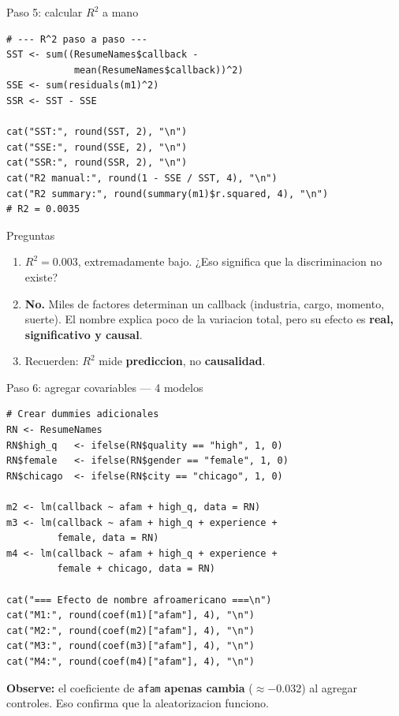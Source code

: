 \documentclass[aspectratio=169, 11pt]{beamer}
\begin{document}
\begin{frame}[fragile]{Paso 5: calcular $R^2$ a mano}
\begin{lstlisting}[basicstyle=\ttfamily\scriptsize]
# --- R^2 paso a paso ---
SST <- sum((ResumeNames$callback -
            mean(ResumeNames$callback))^2)
SSE <- sum(residuals(m1)^2)
SSR <- SST - SSE

cat("SST:", round(SST, 2), "\n")
cat("SSE:", round(SSE, 2), "\n")
cat("SSR:", round(SSR, 2), "\n")
cat("R2 manual:", round(1 - SSE / SST, 4), "\n")
cat("R2 summary:", round(summary(m1)$r.squared, 4), "\n")
# R2 = 0.0035
\end{lstlisting}

\vspace{0.1cm}
\begin{alertblock}{Preguntas}
\footnotesize
\begin{enumerate}\setlength{\itemsep}{1pt}
  \item $R^2 = 0.003$, extremadamente bajo. ¿Eso significa que la discriminacion no existe?
  \item \textbf{No.} Miles de factores determinan un callback (industria, cargo, momento, suerte). El nombre explica poco de la variacion total, pero su efecto es \textbf{real, significativo y causal}.
  \item Recuerden: $R^2$ mide \textbf{prediccion}, no \textbf{causalidad}.
\end{enumerate}
\end{alertblock}
\end{frame}

\begin{frame}[fragile]{Paso 6: agregar covariables --- 4 modelos}
\begin{lstlisting}[basicstyle=\ttfamily\scriptsize]
# Crear dummies adicionales
RN <- ResumeNames
RN$high_q   <- ifelse(RN$quality == "high", 1, 0)
RN$female   <- ifelse(RN$gender == "female", 1, 0)
RN$chicago  <- ifelse(RN$city == "chicago", 1, 0)

m2 <- lm(callback ~ afam + high_q, data = RN)
m3 <- lm(callback ~ afam + high_q + experience +
         female, data = RN)
m4 <- lm(callback ~ afam + high_q + experience +
         female + chicago, data = RN)

cat("=== Efecto de nombre afroamericano ===\n")
cat("M1:", round(coef(m1)["afam"], 4), "\n")
cat("M2:", round(coef(m2)["afam"], 4), "\n")
cat("M3:", round(coef(m3)["afam"], 4), "\n")
cat("M4:", round(coef(m4)["afam"], 4), "\n")
\end{lstlisting}

\vspace{0.1cm}
\small \textbf{Observe:} el coeficiente de \texttt{afam} \textbf{apenas cambia} ($\approx -0.032$) al agregar controles. Eso confirma que la aleatorizacion funciono.
\end{frame}
\end{document}
